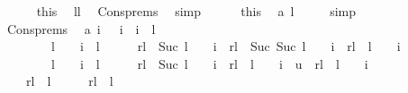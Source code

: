 \begin{isabellebody}
\ \ \ \ \isamarkupfalse%
\ this\ \isamarkupfalse%
\ l{}{\isacharcolon}{\isachardoublequoteopen}l{\isasymge}{}{\isachardoublequoteclose}\ \isamarkupfalse%
\ Cons{\isachardot}prems\ \isamarkupfalse%
\ simp\isanewline
\ \ \ \ \isamarkupfalse%
\ this\ \isamarkupfalse%
\ a{}{\isacharcolon}{\isachardoublequoteopen}\ l\ {\isacharminus}{}\ {\isasymge}\ {}{\isachardoublequoteclose}\ \isamarkupfalse%
\ simp\isanewline
\ \ \ \ \isamarkupfalse%
\ Cons{\isachardot}prems\ \isamarkupfalse%
\ a{}{\isacharcolon}\ {\isachardoublequoteopen}{\isasymforall}i{\isachardot}\ {}\ {\isasymle}\ i\ {\isasymand}\ i\ {\isasymle}\ l\ {\isacharminus}\ {}\ {\isasymlongrightarrow}\isanewline
\ \ \ \ \ \ \ \ {\isacharparenleft}l\ {\isacharminus}\ {}\ {\isacharminus}\ i\ {\isacharless}\ l\ {\isacharminus}\ {}\ {\isacharminus}\ {}\ {\isasymlongrightarrow}\ rl\ {\isacharbang}\ Suc\ {\isacharparenleft}l\ {\isacharminus}\ {}\ {\isacharminus}\ i{\isacharparenright}\ {\isacharplus}\ rl\ {\isacharbang}\ Suc\ {\isacharparenleft}Suc\ {\isacharparenleft}l\ {\isacharminus}\ {}\ {\isacharminus}\ i{\isacharparenright}{\isacharparenright}\ {\isacharless}\ rl\ {\isacharbang}\ {\isacharparenleft}l\ {\isacharminus}\ {}\ {\isacharminus}\ i{\isacharparenright}{\isacharparenright}\ {\isasymand}\isanewline
\ \ \ \ \ \ \ \ {\isacharparenleft}l\ {\isacharminus}\ {}\ {\isacharminus}\ i\ {\isacharless}\ l\ {\isacharminus}\ {}\ {\isacharminus}\ {}\ {\isasymlongrightarrow}\ rl\ {\isacharbang}\ Suc\ {\isacharparenleft}l\ {\isacharminus}\ {}\ {\isacharminus}\ i{\isacharparenright}\ {\isacharless}\ rl\ {\isacharbang}\ {\isacharparenleft}l\ {\isacharminus}\ {}\ {\isacharminus}\ i{\isacharparenright}{\isacharparenright}\ {\isasymand}\ u\ {\isasymle}\ rl\ {\isacharbang}\ {\isacharparenleft}l\ {\isacharminus}\ {}\ {\isacharminus}\ i{\isacharparenright}\ {\isasymLongrightarrow}\isanewline
\ \ \ \ rl\ {\isacharbang}\ {\isacharparenleft}l\ {\isacharminus}\ {}\ {\isacharminus}\ {}{\isacharparenright}\ {\isacharless}\ rl\ {\isacharbang}\ {\isacharparenleft}l\ {\isacharminus}\ {}\ {\isacharminus}\ {}{\isacharparenright}{\isachardoublequoteclose}\isanewline
\ \ \ \ \ \ \isamarkupfalse%

\end{isabellebody}
